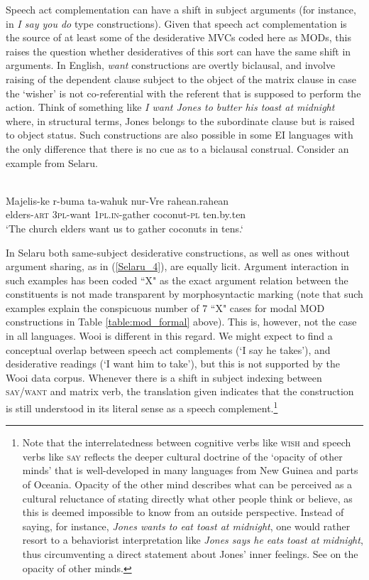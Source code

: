 Speech act complementation can have a shift in subject arguments (for instance, in \textit{I say you do} type constructions). Given that speech act complementation is the source of at least some of the desiderative MVCs coded here as MODs, this raises the question whether desideratives of this sort can have the same shift in arguments. In English, \textit{want} constructions are overtly biclausal, and involve raising of the dependent clause subject to the object of the matrix clause in case the `wisher' is not co-referential with the referent that is supposed to perform the action. Think of something like \textit{I want Jones to butter his toast at midnight} where, in structural terms, Jones belongs to the subordinate clause but is raised to object status. Such constructions are also possible in some EI languages with the only difference that there is no cue as to a biclausal construal. Consider an example from Selaru.

\ea \label{Selaru_4}
\\
\gll Majelis-ke r-buma ta-wahuk nur-Vre rahean.rahean \\
elders-\textsc{art} 3\textsc{pl}-want 1\textsc{pl}.\textsc{in}-gather coconut-\textsc{pl} ten.by.ten \\
\glft `The church elders want us to gather coconuts in tens.‘\\ 
\z

In Selaru both same-subject desiderative constructions, as well as ones without argument sharing, as in (\ref{Selaru_4}), are equally licit. Argument interaction in such examples has been coded ``X" as the exact argument relation between the constituents is not made transparent by morphosyntactic marking (note that such examples explain the conspicuous number of 7 ``X" cases for modal MOD constructions in Table \ref{table:mod_formal} above). This is, however, not the case in all languages. Wooi is different in this regard. We might expect to find a conceptual overlap between speech act complements (`I say he takes'), and desiderative readings (`I want him to take'), but this is not supported by the Wooi data corpus. Whenever there is a shift in subject indexing between \textsc{say}/\textsc{want} and matrix verb, the translation given indicates that the construction is still understood in its literal sense as a speech complement.\footnote{Note that the interrelatedness between cognitive verbs like \textsc{wish} and speech verbs like \textsc{say} reflects the deeper cultural doctrine of the `opacity of other minds' that is well-developed in many languages from New Guinea and parts of Oceania. Opacity of the other mind describes what can be perceived as a cultural reluctance of stating directly what other people think or believe, as this is deemed impossible to know from an outside perspective. Instead of saying, for instance, \textit{Jones wants to eat toast at midnight}, one would rather resort to a behaviorist interpretation \citep{robbins2008not} like \textit{Jones says he eats toast at midnight}, thus circumventing a direct statement about Jones' inner feelings. See \citet{robbins2008introduction, robbins2008not, rumsey2013intersubjectivity} on the opacity of other minds.}

